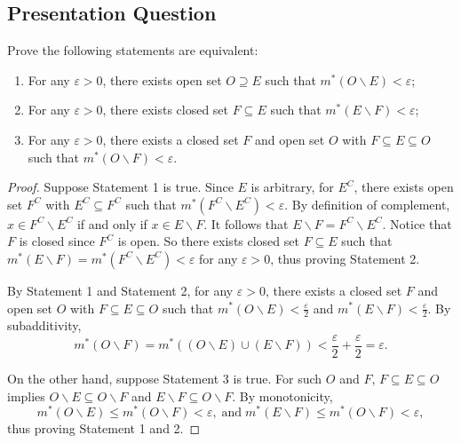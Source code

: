 \documentclass[class=book, crop=false]{standalone}
\begin{document}
    \subsection{Presentation Question}
    \begin{question}
        Prove the following statements are equivalent:
        \begin{enumerate}
            \item For any $\varepsilon > 0$, there exists open set $O \supseteq E$ such that $m^*(O \backslash E) < \varepsilon$;
            \item For any $\varepsilon > 0$, there exists closed set $F \subseteq E$ such that $m^*(E \backslash F) < \varepsilon$;
            \item For any $\varepsilon > 0$, there exists a closed set $F$ and open set $O$ with $F \subseteq E \subseteq O$ such that $m^*(O \backslash F) < \varepsilon$.
        \end{enumerate}
        \begin{proof}
            Suppose Statement 1 is true. Since $E$ is arbitrary, for $E^C$, there exists open set $F^C$ with $E^C \subseteq F^C$ such that $m^*(F^C \backslash E^C) < \varepsilon$. By definition of complement, $x \in F^C \backslash E^C$ if and only if $x \in E \backslash F$. It follows that $E \backslash F = F^C \backslash E^C$. Notice that $F$ is closed since $F^C$ is open. So there exists closed set $F \subseteq E$ such that $m^*(E \backslash F) = m^*(F^C \backslash E^C) < \varepsilon$ for any $\varepsilon > 0$, thus proving Statement 2.

            \noindent By Statement 1 and Statement 2, for any $\varepsilon > 0$, there exists a closed set $F$ and open set $O$ with $F \subseteq E \subseteq O$ such that $m^*(O \backslash E) < \frac{\varepsilon}{2}$ and $m^*(E \backslash F) < \frac{\varepsilon}{2}$. By subadditivity,
            \begin{equation*}
                m^*(O \backslash F) = m^*((O \backslash E) \cup (E \backslash F)) < \frac{\varepsilon}{2} + \frac{\varepsilon}{2} = \varepsilon.
            \end{equation*}

            \noindent On the other hand, suppose Statement 3 is true. For such $O$ and $F$, $F \subseteq E \subseteq O$ implies $O \backslash E \subseteq O \backslash F$ and $E \backslash F \subseteq O \backslash F$. By monotonicity,
            \begin{equation*}
                m^*(O \backslash E) \leq m^*(O \backslash F) < \varepsilon, \;\text{and}\; m^*(E \backslash F) \leq m^*(O \backslash F) < \varepsilon,
            \end{equation*}
            thus proving Statement 1 and 2.
        \end{proof}
    \end{question}
\end{document}
